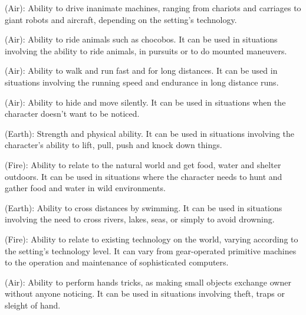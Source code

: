 \begin{multicols}{2}
\begin{ffcolpage}
 (Air): Ability to drive inanimate machines, ranging from chariots and carriages to giant robots and aircraft, depending on the setting’s technology.
\end{ffcolpage} \pw \begin{ffcolpage}
 (Air): Ability to ride animals such as chocobos. It can be used in situations involving the ability to ride animals, in pursuits or to do mounted maneuvers.
\end{ffcolpage} \pw \begin{ffcolpage}
 (Air): Ability to walk and run fast and for long distances. It can be used in situations involving the running speed and endurance in long distance runs.
\end{ffcolpage} \pw \begin{ffcolpage}
 (Air): Ability to hide and move silently. It can be used in situations when the character doesn’t want to be noticed.
\end{ffcolpage} \pw \begin{ffcolpage}
 (Earth): Strength and physical ability. It can be used in situations involving the character's ability to lift, pull, push and knock down things.
\end{ffcolpage} \pw \begin{ffcolpage}
 (Fire): Ability to relate to the natural world and get food, water and shelter outdoors. It can be used in situations where the character needs to hunt and gather food and water in wild environments.
\end{ffcolpage} \pw \begin{ffcolpage}
 (Earth): Ability to cross distances by swimming. It can be used in situations involving the need to cross rivers, lakes, seas, or simply to avoid drowning.
\end{ffcolpage} \pw \begin{ffcolpage}
 (Fire): Ability to relate to existing technology on the world, varying according to the setting’s technology level. It can vary from gear-operated primitive machines to the operation and maintenance of sophisticated computers.
\end{ffcolpage} \pw \begin{ffcolpage}
 (Air): Ability to perform hands tricks, as making small objects exchange owner without anyone noticing. It can be used in situations involving theft, traps or sleight of hand.

\end{ffcolpage}
\end{multicols}
